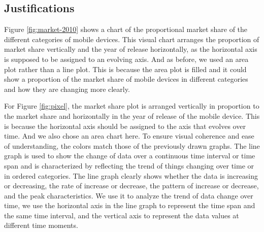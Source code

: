 \documentclass[conference]{IEEEtran}
\begin{document}
\subsection{Justifications}
Figure \ref{fig:market-2010} shows a chart of the proportional market share of the different categories of mobile devices. This visual chart arranges the proportion of market share vertically and the year of release horizontally, as the horizontal axis is supposed to be assigned to an evolving axis. And as before, we used an area plot rather than a line plot. This is because the area plot is filled and it could show a proportion of the market share of mobile devices in different categories and how they are changing more clearly. 

For Figure \ref{fig:pixel}, the market share plot is arranged vertically in proportion to the market share and horizontally in the year of release of the mobile device. This is because the horizontal axis should be assigned to the axis that evolves over time. And we also chose an area chart here. To ensure visual coherence and ease of understanding, the colors match those of the previously drawn graphs. The line graph is used to show the change of data over a continuous time interval or time span and is characterized by reflecting the trend of things changing over time or in ordered categories. The line graph clearly shows whether the data is increasing or decreasing, the rate of increase or decrease, the pattern of increase or decrease, and the peak characteristics. We use it to analyze the trend of data change over time, we use the horizontal axis in the line graph to represent the time span and the same time interval, and the vertical axis to represent the data values at different time moments.



\end{document}
